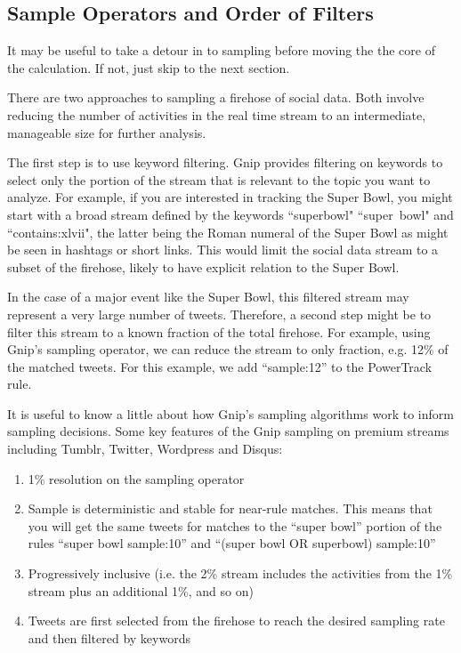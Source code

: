 \documentclass{article}
\begin{document}
\subsection{Sample Operators and Order of Filters} 

It may be useful to take a detour in to sampling before moving the the core of the calculation.  If not, just skip to the next section.

There are two approaches to sampling a firehose of social data. Both involve reducing the number of activities in the real time stream to an intermediate, manageable size for further analysis.

The first step is to use keyword filtering.  Gnip provides filtering on keywords to select only the portion of the stream that is relevant to the topic you want to analyze. For example, if you are interested in tracking the Super Bowl, you might start with a broad stream defined by the keywords ``superbowl" ``super~bowl" and ``contains:xlvii", the latter being the Roman numeral of the Super Bowl as might be seen in hashtags or short links. This would limit the social data stream to a subset of the firehose, likely to have explicit relation to the Super Bowl.

In the case of a major event like the Super Bowl, this filtered stream may represent a very large number of tweets.  Therefore, a second step might be to filter this stream to a known fraction of the total firehose. For example, using Gnip's sampling operator, we can reduce the stream to only fraction, e.g. 12\% of the matched tweets. For this example, we add ``sample:12'' to the PowerTrack rule.

It is useful to know a little about how Gnip's sampling algorithms work to inform sampling decisions.  Some key features of the Gnip sampling on premium streams including Tumblr, Twitter, Wordpress and Disqus:

\begin{enumerate}
	\item 1\% resolution on the sampling operator
	\item Sample is deterministic and stable for near-rule matches.  This means that you will get the same tweets for matches to the ``super bowl'' portion of the rules ``super bowl sample:10'' and ``(super bowl OR superbowl) sample:10''
	\item Progressively inclusive (i.e. the 2\% stream includes the activities from the 1\% stream plus an additional 1\%,  and so on)
	\item Tweets are first selected from the firehose to reach the desired sampling rate and then filtered by keywords 
\end{enumerate}
\end{document}
